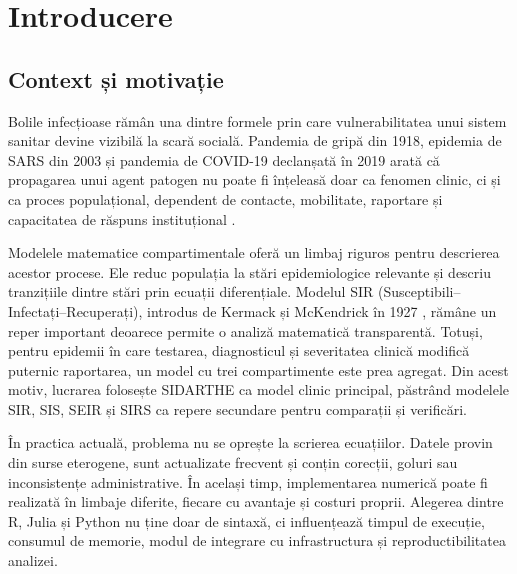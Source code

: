 
\chapter*{Introducere}
\label{ch:introducere}

{}
\section*{Context și motivație}
\label{sec:context}

Bolile infecțioase rămân una dintre formele prin care vulnerabilitatea unui sistem
sanitar devine vizibilă la scară socială. Pandemia de gripă din 1918, epidemia de
SARS din 2003 și pandemia de COVID-19 declanșată în 2019 arată că propagarea unui
agent patogen nu poate fi înțeleasă doar ca fenomen clinic, ci și ca proces
populațional, dependent de contacte, mobilitate, raportare și capacitatea de
răspuns instituțional \cite{andersonmay1991, hethcote2000}.

Modelele matematice compartimentale oferă un limbaj riguros pentru descrierea
acestor procese. Ele reduc populația la stări epidemiologice relevante și descriu
tranzițiile dintre stări prin ecuații diferențiale. Modelul SIR
(Susceptibili--Infectați--Recuperați), introdus de Kermack și McKendrick în 1927
\cite{kermack1927}, rămâne un reper important deoarece permite o analiză
matematică transparentă. Totuși, pentru epidemii în care testarea, diagnosticul și
severitatea clinică modifică puternic raportarea, un model cu trei compartimente
este prea agregat. Din acest motiv, lucrarea folosește SIDARTHE ca model clinic
principal, păstrând modelele SIR, SIS, SEIR și SIRS ca repere secundare pentru
comparații și verificări.

În practica actuală, problema nu se oprește la scrierea ecuațiilor. Datele provin
din surse eterogene, sunt actualizate frecvent și conțin corecții, goluri sau
inconsistențe administrative. În același timp, implementarea numerică poate fi
realizată în limbaje diferite, fiecare cu avantaje și costuri proprii. Alegerea
dintre R, Julia și Python nu ține doar de sintaxă, ci influențează timpul de execuție,
consumul de memorie, modul de integrare cu infrastructura și reproductibilitatea
analizei.

